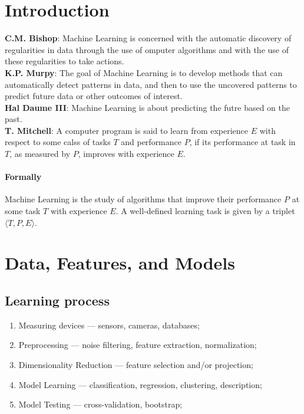 \documentclass[a4paper,6pt,twocolumn,fleqn]{article}
\begin{document}
\footnotesize

\section{Introduction}
\textbf{C.M. Bishop}: Machine Learning is concerned with the automatic discovery of regularities in data through the use of omputer algorithms and with the use of these regularities to take actions.\\
\textbf{K.P. Murpy}: The goal of Machine Learning is to develop methods that can automatically detect patterns in data, and then to use the uncovered patterns to predict future data or other outcomes of interest.\\
\textbf{Hal Daume III}: Machine Learning is about predicting the futre based on the past.\\
\textbf{T. Mitchell}: A computer program is said to learn from experience \(E\) with respect to some calss of tasks \(T\) and performance \(P\), if its performance at task in \(T\), as measured by \(P\), improves with experience \(E\).
\paragraph{Formally}
Machine Learning is the study of algorithms that improve their performance \(P\) at some task \(T\) with experience \(E\). A well-defined learning task is given by a triplet \(\langle T, P, E \rangle\).

\section{Data, Features, and Models}

\subsection{Learning process}
\begin{enumerate}
    \item Measuring devices --- sensors, cameras, databases;
    \item Preprocessing --- noise filtering, feature extraction, normalization;
    \item Dimensionality Reduction --- feature selection and/or projection;
    \item Model Learning --- classification, regression, clustering, description;
    \item Model Testing --- cross-validation, bootstrap;
\end{enumerate}
\end{document}
